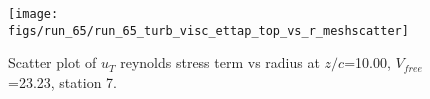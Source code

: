 \begin{figure}[H]
\centering
\texttt{[image: figs/run\_65/run\_65\_turb\_visc\_ettap\_top\_vs\_r\_meshscatter]}
\caption{Scatter plot of $
u_T$ reynolds stress term vs radius at $z/c$=10.00, $V_{free}$=23.23, station 7.}
\end{figure}


